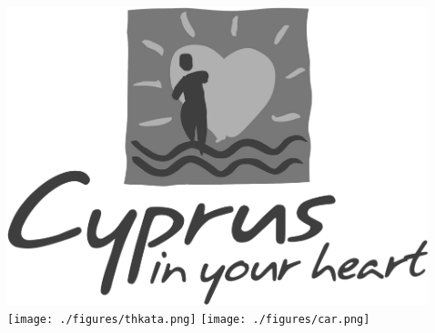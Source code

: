 \begin{columns}[T]
  \begin{column}{0.45\textwidth}
    
  \end{column}
  \begin{column}{0.15\textwidth}
    \vspace{0.2cm}
    \includegraphics[width=1.0\textwidth]{./figures/Cyprus-in-your-heart.png}
    \vspace{0.2cm}
    \texttt{[image: ./figures/thkata.png]}
    \vspace{-0.5cm}
    \texttt{[image: ./figures/car.png]}
  \end{column}
  \begin{column}{0.4\textwidth}
    
    
  \end{column}
\end{columns}  



%
%  

